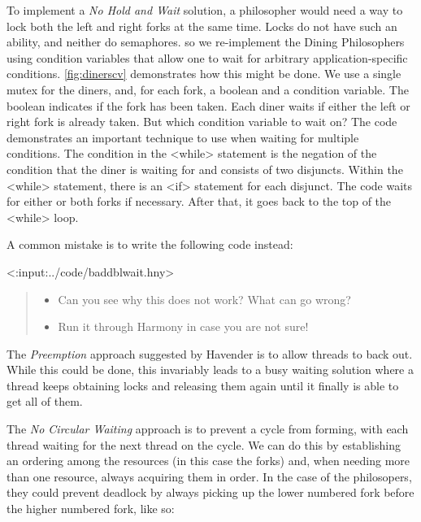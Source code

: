 \documentclass{report}
\newenvironment{code}{
\tcolorbox
}{
\endtcolorbox
}
\begin{document}
To implement a \emph{No Hold and Wait} solution, a philosopher would need a
way to lock both the left and right forks at the same time.  Locks do not
have such an ability, and neither do semaphores. so we re-implement the
Dining Philosophers using condition variables that allow one to wait for
arbitrary application-specific conditions.
%
\autoref{fig:dinerscv} demonstrates how this might be done.
We use a single mutex for the diners, and, for each fork, a boolean
and a condition variable.  The boolean indicates if the fork has been
taken.
Each diner waits if either the left or right fork is already taken.
But which condition variable to wait on?
The code demonstrates an important technique to use when waiting for
multiple conditions.
%
The condition in the <{while}> statement is the negation of the
condition that the diner is waiting for and consists of two disjuncts.
Within the <{while}> statement,
there is an <{if}> statement for each disjunct.
The code waits for either or both forks if necessary.  After that, it goes
back to the top of the <{while}> loop.

A common mistake is to write the following code instead:

\begin{code}
<{:input:../code/baddblwait.hny}>
\end{code}

\begin{quote}
\begin{itemize}
\item Can you see why this does not work?  What can go wrong?
\item Run it through Harmony in case you are not sure!
\end{itemize}
\end{quote}

The \emph{Preemption} approach suggested by Havender is to allow threads to back out.
While this could be done, this invariably leads to a busy waiting solution
where a thread keeps obtaining locks and releasing them again until it
finally is able to get all of them.

The \emph{No Circular Waiting} approach
is to prevent a cycle from forming, with each
thread waiting for the next thread on the cycle.
We can do this by establishing an ordering among the
resources (in this case the forks) and, when needing more than one
resource, always acquiring them in order.  In the case of the philosopers,
they could prevent deadlock by always picking up the lower numbered fork
before the higher numbered fork, like so:
\end{document}
